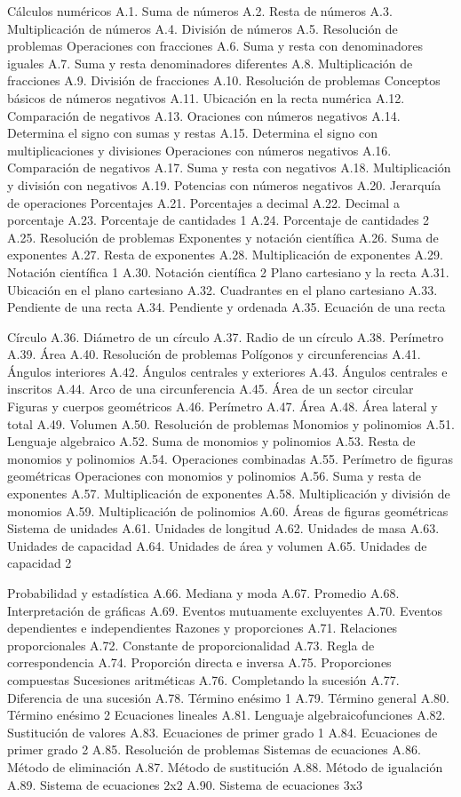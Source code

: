 Cálculos numéricos
A.1.  Suma de números
A.2.  Resta de números
A.3.  Multiplicación de números
A.4.  División de números
A.5.  Resolución de problemas
Operaciones con fracciones 
A.6.  Suma y resta con denominadores iguales
A.7.  Suma y resta denominadores diferentes
A.8.  Multiplicación de fracciones
A.9.  División de fracciones
A.10. Resolución de problemas
Conceptos básicos de números negativos
A.11. Ubicación en la recta numérica
A.12. Comparación de negativos
A.13. Oraciones con números negativos
A.14. Determina el signo con sumas y restas
A.15. Determina el signo con multiplicaciones y divisiones
Operaciones con números negativos
A.16. Comparación de negativos
A.17. Suma y resta con negativos
A.18. Multiplicación y división con negativos
A.19. Potencias con números negativos
A.20. Jerarquía de operaciones
Porcentajes
A.21. Porcentajes a decimal
A.22. Decimal a porcentaje
A.23. Porcentaje de cantidades 1
A.24. Porcentaje de cantidades 2
A.25. Resolución de problemas
Exponentes y notación científica
A.26. Suma de exponentes
A.27. Resta de exponentes
A.28. Multiplicación de exponentes
A.29. Notación científica 1
A.30. Notación científica 2
Plano cartesiano y la recta
A.31. Ubicación en el plano cartesiano
A.32. Cuadrantes en el plano cartesiano
A.33. Pendiente de una recta
A.34. Pendiente y ordenada
A.35. Ecuación de una recta


Círculo
A.36. Diámetro de un círculo
A.37. Radio de un círculo
A.38. Perímetro
A.39. Área
A.40. Resolución de problemas
Polígonos y circunferencias
A.41. Ángulos interiores
A.42. Ángulos centrales y exteriores
A.43. Ángulos centrales e inscritos
A.44. Arco de una circunferencia
A.45. Área de un sector circular
Figuras y cuerpos geométricos
A.46. Perímetro
A.47. Área
A.48. Área lateral y total
A.49. Volumen
A.50. Resolución de problemas
Monomios y polinomios
A.51. Lenguaje algebraico
A.52. Suma de monomios y polinomios
A.53. Resta de monomios y polinomios
A.54. Operaciones combinadas
A.55. Perímetro de figuras geométricas
Operaciones con monomios y polinomios
A.56. Suma y resta de exponentes
A.57. Multiplicación de exponentes
A.58. Multiplicación y división de monomios
A.59. Multiplicación de polinomios
A.60. Áreas de figuras geométricas
Sistema de unidades
A.61. Unidades de longitud
A.62. Unidades de masa
A.63. Unidades de capacidad
A.64. Unidades de área y volumen
A.65. Unidades de capacidad 2

Probabilidad y estadística
A.66. Mediana y moda
A.67. Promedio
A.68. Interpretación de gráficas
A.69. Eventos mutuamente excluyentes
A.70. Eventos dependientes e independientes
Razones y proporciones
A.71. Relaciones proporcionales
A.72. Constante de proporcionalidad
A.73. Regla de correspondencia
A.74. Proporción directa e inversa
A.75. Proporciones compuestas
Sucesiones aritméticas
A.76. Completando la sucesión
A.77. Diferencia de una sucesión
A.78. Término enésimo 1
A.79. Término general
A.80. Término enésimo 2
Ecuaciones lineales
A.81. Lenguaje algebraicofunciones
A.82. Sustitución de valores
A.83. Ecuaciones de primer grado 1
A.84. Ecuaciones de primer grado 2
A.85. Resolución de problemas
Sistemas de ecuaciones
A.86. Método de eliminación
A.87. Método de sustitución
A.88. Método de igualación
A.89. Sistema de ecuaciones 2x2
A.90. Sistema de ecuaciones 3x3